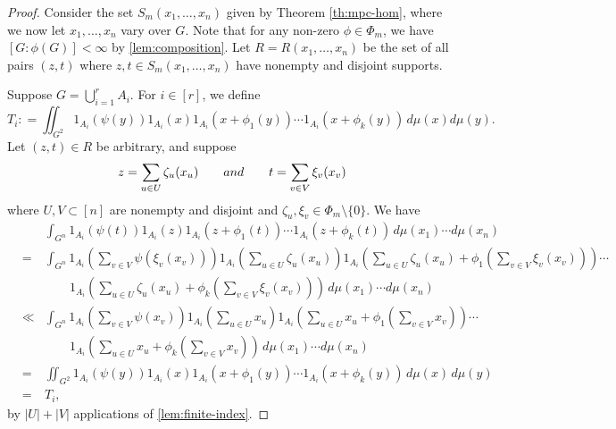 \documentclass[10pt]{article}
\theoremstyle{definition}
\begin{document}
\begin{proof}Consider the set $S_m(x_1, \ldots, x_n)$ given by Theorem \ref{th:mpc-hom}, where we now let $x_1, \ldots, x_n$ vary over $G$. Note that for any non-zero $\phi \in \Phi_m$, we have $[G:\phi(G)] < \infty$ by \cref{lem:composition}. Let $R=R(x_1, \ldots, x_n)$ be the set of all pairs $(z, t)$ where $z, t \in S_m(x_1, \ldots, x_n)$ have nonempty and disjoint supports.

Suppose $G = \bigcup_{i=1}^r A_i$. For $i \in [r]$, we define
\[
T_i : = \iint_{G^2} 1_{A_i}( \psi(y) )  1_{A_i}(x) 1_{A_i}(x+ \phi_1(y)) \cdots 1_{A_i}(x+ \phi_k(y)) \, d\mu(x) d\mu(y). 
\]
Let $(z,t) \in R$ be arbitrary, and suppose
\[
z = \sum_{u \in U} \zeta_u(x_u) \qquad \textup{and} \qquad t = \sum_{v \in V} \xi_v (x_v)
\]
where $U, V \subset [n]$ are nonempty and disjoint and $\zeta_u, \xi_v \in \Phi_m \setminus \{ 0\}$. We have
\begin{eqnarray*}
& & \int_{G^n}  1_{A_i}( \psi(t)) 1_{A_i}(z) 
1_{A_i}(z+ \phi_1(t)) \cdots 1_{A_i}(z+ \phi_k(t)) \, d\mu(x_1) \cdots d\mu(x_n) \\
& = & \int_{G^n} 1_{A_i} \left( \sum_{v \in V} \psi( \xi_v (x_v) ) \right) 
1_{A_i} \left( \sum_{u \in U} \zeta_u(x_u)\right)
1_{A_i} \left( \sum_{u \in U} \zeta_u(x_u)  + \phi_1 \left( \sum_{v \in V} \xi_v (x_v) \right) \right) \cdots \\
& & \qquad 1_{A_i} \left( \sum_{u \in U} \zeta_u(x_u)  + \phi_k \left( \sum_{v \in V} \xi_v (x_v) \right)  \right) \, d\mu(x_1) \cdots d \mu(x_n) \\
& \ll & \int_{G^n} 1_{A_i} \left( \sum_{v \in V} \psi( x_v ) \right) 
1_{A_i} \left( \sum_{u \in U} x_u \right)
1_{A_i} \left( \sum_{u \in U} x_u  + \phi_1 \left( \sum_{v \in V} x_v \right) \right) \cdots \\
& & \qquad 1_{A_i} \left( \sum_{u \in U} x_u  + \phi_k \left( \sum_{v \in V} x_v \right)  \right) \, d\mu(x_1) \cdots d \mu(x_n) \\
& = & \iint_{G^2} 1_{A_i}( \psi(y) ) 1_{A_i}(x) 1_{A_i}(x  + \phi_1(y) ) \cdots 1_{A_i}(x  + \phi_k(y) ) \, d\mu(x) \, d\mu(y) \\
&=& T_i, 
\end{eqnarray*}
by $|U|+|V|$ applications of \cref{lem:finite-index}. 



\end{proof}
\end{document}
